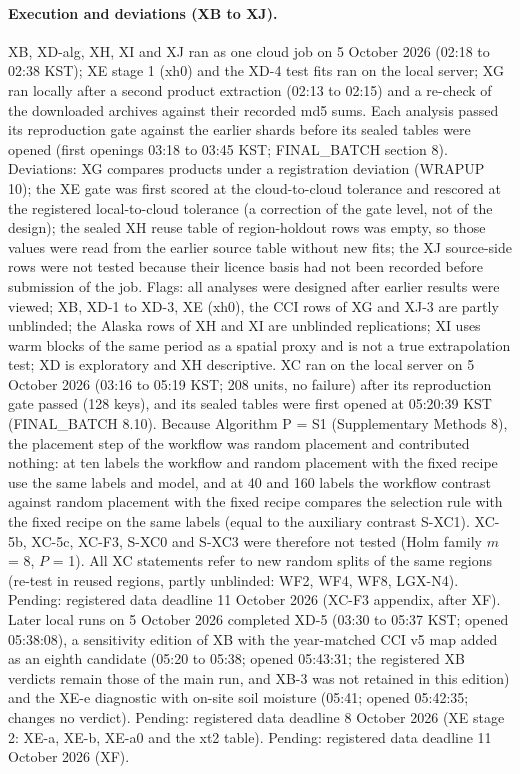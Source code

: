\paragraph*{Execution and deviations (XB to XJ).} XB, XD-alg, XH, XI and XJ ran as one cloud job on 5 October 2026 (02:18 to 02:38 KST); XE stage 1 (xh0) and the XD-4 test fits ran on the local server; XG ran locally after a second product extraction (02:13 to 02:15) and a re-check of the downloaded archives against their recorded md5 sums. Each analysis passed its reproduction gate against the earlier shards before its sealed tables were opened (first openings 03:18 to 03:45 KST; FINAL\_BATCH section 8). Deviations: XG compares products under a registration deviation (WRAPUP 10); the XE gate was first scored at the cloud-to-cloud tolerance and rescored at the registered local-to-cloud tolerance (a correction of the gate level, not of the design); the sealed XH reuse table of region-holdout rows was empty, so those values were read from the earlier source table without new fits; the XJ source-side rows were not tested because their licence basis had not been recorded before submission of the job. Flags: all analyses were designed after earlier results were viewed; XB, XD-1 to XD-3, XE (xh0), the CCI rows of XG and XJ-3 are partly unblinded; the Alaska rows of XH and XI are unblinded replications; XI uses warm blocks of the same period as a spatial proxy and is not a true extrapolation test; XD is exploratory and XH descriptive. XC ran on the local server on 5 October 2026 (03:16 to 05:19 KST; 208 units, no failure) after its reproduction gate passed (128 keys), and its sealed tables were first opened at 05:20:39 KST (FINAL\_BATCH 8.10). Because Algorithm P = S1 (Supplementary Methods 8), the placement step of the workflow was random placement and contributed nothing: at ten labels the workflow and random placement with the fixed recipe use the same labels and model, and at 40 and 160 labels the workflow contrast against random placement with the fixed recipe compares the selection rule with the fixed recipe on the same labels (equal to the auxiliary contrast S-XC1). XC-5b, XC-5c, XC-F3, S-XC0 and S-XC3 were therefore not tested (Holm family $m$ = 8, $P$ = 1). All XC statements refer to new random splits of the same regions (re-test in reused regions, partly unblinded: WF2, WF4, WF8, LGX-N4). Pending: registered data deadline 11 October 2026 (XC-F3 appendix, after XF). Later local runs on 5 October 2026 completed XD-5 (03:30 to 05:37 KST; opened 05:38:08), a sensitivity edition of XB with the year-matched CCI v5 map added as an eighth candidate (05:20 to 05:38; opened 05:43:31; the registered XB verdicts remain those of the main run, and XB-3 was not retained in this edition) and the XE-e diagnostic with on-site soil moisture (05:41; opened 05:42:35; changes no verdict). Pending: registered data deadline 8 October 2026 (XE stage 2: XE-a, XE-b, XE-a0 and the xt2 table). Pending: registered data deadline 11 October 2026 (XF).

